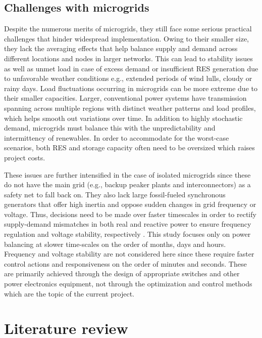 \documentclass[final,3p,times]{elsarticle}
\begin{document}
\subsection{Challenges with microgrids \label{sec:MG_challenges}}

Despite the numerous merits of microgrids, they still face some serious practical challenges that hinder widespread implementation. Owing to their smaller size, they lack the averaging effects that help balance supply and demand across different locations and nodes in larger networks. This can lead to stability issues as well as unmet load in case of excess demand or insufficient RES generation due to unfavorable weather conditions e.g., extended periods of wind lulls, cloudy or rainy days. Load fluctuations occurring in microgrids can be more extreme due to their smaller capacities. Larger, conventional power systems have transmission spanning across multiple regions with distinct weather patterns and load profiles, which helps smooth out variations over time. In addition to highly stochastic demand, microgrids must balance this with the unpredictability and intermittency of renewables. In order to accommodate for the worst-case scenarios, both RES and storage capacity often need to be oversized which raises project costs. 

These issues are further intensified in the case of isolated microgrids since these do not have the main grid (e.g., backup peaker plants and interconnectors) as a safety net to fall back on. They also lack large fossil-fueled synchronous generators that offer high inertia and oppose sudden changes in grid frequency or voltage. Thus, decisions need to be made over faster timescales in order to rectify supply-demand mismatches in both real and reactive power to ensure frequency regulation and voltage stability, respectively \cite{tech_challenges}. This study focuses only on power balancing at slower time-scales on the order of months, days and hours. Frequency and voltage stability are not considered here since these require faster control actions and responsiveness on the order of minutes and seconds. These are primarily achieved through the design of appropriate switches and other power electronics equipment, not through the optimization and control methods which are the topic of the current project.

\section{Literature review}
\end{document}
